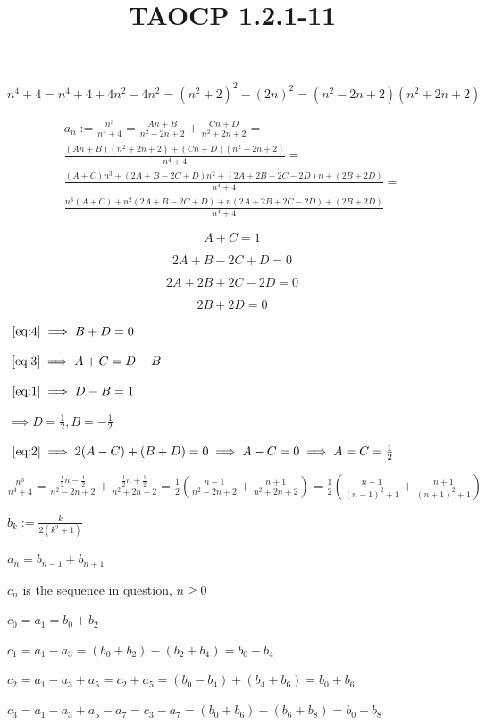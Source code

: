 \documentclass{article}
\title{TAOCP 1.2.1\mbox{-}11}
\begin{document}
\maketitle

\( n^{4} + 4 = n^{4} + 4 + 4n^{2} - 4n^{2} = {(n^{2} + 2)}^{2} - {(2n)}^{2} = (n^{2} - 2n + 2)(n^{2} + 2n + 2) \)

\begin{multline*}
a_{n} := \frac{n^{3}}{n^{4}+4} = \frac{An+B}{n^{2}-2n+2} + \frac{Cn+D}{n^{2}+2n+2} = \\
\frac{(An+B)(n^{2}+2n+2)+(Cn+D)(n^{2}-2n+2)}{n^{4}+4} = \\
\frac{(A+C)n^{3}+(2A+B-2C+D)n^{2}+(2A+2B+2C-2D)n+(2B+2D)}{n^{4}+4} = \\
\frac{n^{3}(A+C) + n^{2}(2A+B-2C+D) + n(2A+2B+2C-2D)+(2B+2D)}{n^{4}+4}
\end{multline*}

\[A+C=1 \tag{1}\label{eq:1}\]

\[2A+B-2C+D = 0 \tag{2}\label{eq:2}\]

\[2A+2B+2C-2D=0 \tag{3}\label{eq:3}\]

\[2B+2D=0 \tag{4}\label{eq:4}\]

\(~\eqref{eq:4} \implies B + D = 0 \)

\(~\eqref{eq:3} \implies A + C = D - B \)

\(~\eqref{eq:1} \implies D - B = 1 \)

\( \implies D = \frac{1}{2}, B = -\frac{1}{2} \)

\(~\eqref{eq:2} \implies 2(A-C) + (B+D) = 0 \implies A - C = 0 \implies A = C = \frac{1}{2} \)

\( \frac{n^{3}}{n^{4}+4} = \frac{\frac{1}{2}n-\frac{1}{2}}{n^{2}-2n+2} + \frac{\frac{1}{2}n+\frac{1}{2}}{n^{2}+2n+2} = \frac{1}{2} (\frac{n-1}{n^{2}-2n+2} + \frac{n+1}{n^{2}+2n+2}) = \frac{1}{2} (\frac{n-1}{{(n-1)}^{2}+1} + \frac{n+1}{{(n+1)}^{2}+1}) \)

\( b_{k} := \frac{k}{2(k^{2}+1)} \)

\( a_{n} = b_{n-1}+b_{n+1} \)

\( c_{n} \) is the sequence in question, \( n \geq 0 \)

\( c_{0} = a_{1} = b_{0} + b_{2} \)

\( c_{1} = a_{1} - a_{3} = (b_{0} + b_{2}) - (b_{2} + b_{4}) = b_{0} - b_{4} \)

\( c_{2}=a_{1}-a_{3}+a_{5} = c_{2} + a_{5} = (b_{0} - b_{4}) + (b_{4} + b_{6}) = b_{0} + b_{6} \)

\( c_{3}=a_{1}-a_{3}+a_{5}-a_{7} = c_{3} - a_{7} = (b_{0} + b_{6}) - (b_{6} + b_{8}) = b_{0} - b_{8} \)
\end{document}
